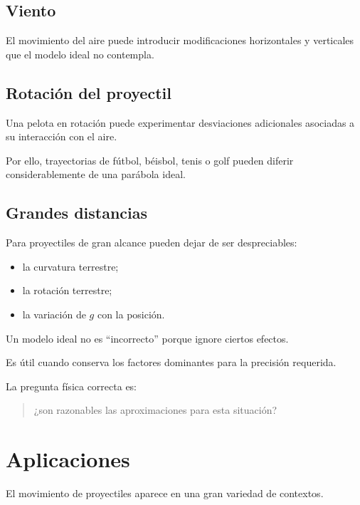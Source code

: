 \subsection{Viento}

El movimiento del aire puede introducir modificaciones horizontales y
verticales que el modelo ideal no contempla.


\subsection{Rotación del proyectil}

Una pelota en rotación puede experimentar desviaciones adicionales asociadas a
su interacción con el aire.

Por ello, trayectorias de fútbol, béisbol, tenis o golf pueden diferir
considerablemente de una parábola ideal.


\subsection{Grandes distancias}

Para proyectiles de gran alcance pueden dejar de ser despreciables:

\begin{itemize}
    \item la curvatura terrestre;
    \item la rotación terrestre;
    \item la variación de \(g\) con la posición.
\end{itemize}

\begin{interpretacion}
Un modelo ideal no es ``incorrecto'' porque ignore ciertos efectos.

Es útil cuando conserva los factores dominantes para la precisión requerida.

La pregunta física correcta es:

\begin{quote}
¿son razonables las aproximaciones para esta situación?
\end{quote}
\end{interpretacion}


\section{Aplicaciones}

El movimiento de proyectiles aparece en una gran variedad de contextos.


